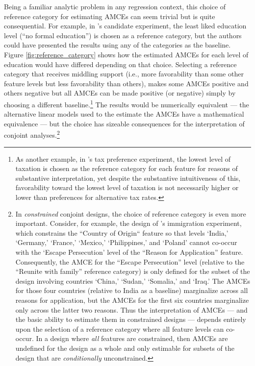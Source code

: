 \documentclass[a4paper,12pt]{article}\usepackage[]{graphicx}\usepackage[]{color}
\begin{document}
Being a familiar analytic problem in any regression context, this choice of reference category for estimating AMCEs can seem trivial but is quite consequential. For example, in \citeauthor{HainmuellerHopkinsYamamoto2014}'s candidate experiment, the least liked education level (``no formal education'') is chosen as a reference category, but the authors could have presented the results using any of the categories as the baseline. Figure \ref{fig:reference_category} shows how the estimated AMCEs for each level of education would have differed depending on that choice. Selecting a reference category that receives middling support (i.e., more favorability than some other feature levels but less favorability than others), makes some AMCEs positive and others negative but all AMCEs can be made positive (or negative) simply by choosing a different baseline.\footnote{As another example, in \citeauthor{BallardRosaMartinScheve2016}'s tax preference experiment, the lowest level of taxation is chosen as the reference category for each feature for reasons of substantive interpretation, yet despite the substantive intuitiveness of this, favorability toward the lowest level of taxation is not necessarily higher or lower than preferences for alternative tax rates.} The results would be numerically equivalent --- the alternative linear models used to the estimate the AMCEs have a mathematical equivalence --- but the choice has sizeable consequences for the interpretation of conjoint analyses.\footnote{In \textit{constrained} conjoint designs, the choice of reference category is even more important. Consider, for example, the design of \citeauthor{HainmuellerHopkinsYamamoto2014}'s immigration experiment, which constrains the ``Country of Origin`` feature so that levels `India,' `Germany,' `France,' `Mexico,' `Philippines,' and `Poland' cannot co-occur with the `Escape Persecution' level of the ``Reason for Application'' feature. Consequently, the AMCE for the ``Escape Persecution'' level (relative to the  ``Reunite with family'' reference category) is only defined for the subset of the design involving countries `China,' `Sudan,' `Somalia,' and `Iraq.' The AMCEs for those four countries (relative to India as a baseline) marginalize across all reasons for application, but the AMCEs for the first six countries marginalize only across the latter two reasons. Thus the interpretation of AMCEs --- and the basic ability to estimate them in constrained designs --- depends entirely upon the selection of a reference category where all feature levels can co-occur. In a design where \textit{all} features are constrained, then AMCEs are undefined for the design as a whole and only estimable for subsets of the design that are \textit{conditionally} unconstrained.}
\end{document}
